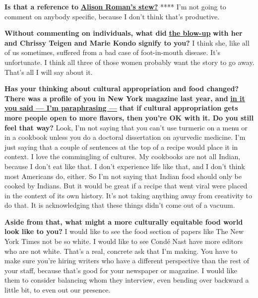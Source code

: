 \textbf{Is that a reference to}
\textbf{\href{http://nytimes3xbfgragh.onion\#tooltip-5}{Alison Roman's
stew?}} **** I'm not going to comment on anybody specific, because I
don't think that's productive.

\textbf{Without commenting on individuals, what did}
\textbf{\href{http://nytimes3xbfgragh.onion\#tooltip-6}{the blow-up}}
\textbf{with her and Chrissy Teigen and Marie Kondo signify to you?} I
think she, like all of us sometimes, suffered from a bad case of
foot-in-mouth disease. It's unfortunate. I think all three of those
women probably want the story to go away. That's all I will say about
it.

\textbf{Has your thinking about cultural appropriation and food changed?
There was a profile of you in New York magazine last year, and}
\textbf{\href{http://nytimes3xbfgragh.onion\#tooltip-7}{in it you said
--- I'm paraphrasing ---}} \textbf{that if cultural appropriation gets
more people open to more flavors, then you're OK with it. Do you still
feel that way?} Look, I'm not saying that you can't use turmeric on a
menu or in a cookbook unless you do a doctoral dissertation on ayurvedic
medicine. I'm just saying that a couple of sentences at the top of a
recipe would place it in context. I love the commingling of cultures. My
cookbooks are not all Indian, because I don't eat like that. I don't
experience life like that, and I don't think most Americans do, either.
So I'm not saying that Indian food should only be cooked by Indians. But
it would be great if a recipe that went viral were placed in the context
of its own history. It's not taking anything away from creativity to do
that. It is acknowledging that these things didn't come out of a vacuum.

\textbf{Aside from that, what might a more culturally equitable food
world look like to you?} I would like to see the food section of papers
like The New York Times not be so white. I would like to see Condé Nast
have more editors who are not white. That's a real, concrete ask that
I'm making. You have to make sure you're hiring writers who have a
different perspective than the rest of your staff, because that's good
for your newspaper or magazine. I would like them to consider balancing
whom they interview, even bending over backward a little bit, to even
out our presence.

